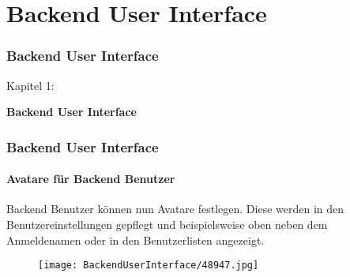 %

\section{Backend User Interface}
\begin{frame}[fragile]
	\frametitle{Backend User Interface}

	\begin{center}\huge{Kapitel 1:}\end{center}
	\begin{center}\huge{\color{typo3darkgrey}\textbf{Backend User Interface}}\end{center}

\end{frame}

\begin{frame}[fragile]
	\frametitle{Backend User Interface}
	\framesubtitle{Avatare für Backend Benutzer}

	Backend Benutzer können nun Avatare festlegen.
	Diese werden in den Benutzereinstellungen gepflegt und beispielsweise oben neben dem Anmeldenamen
	oder in den Benutzerlisten angezeigt.

	\begin{figure}
		\texttt{[image: BackendUserInterface/48947.jpg]}
	\end{figure}

\end{frame}

